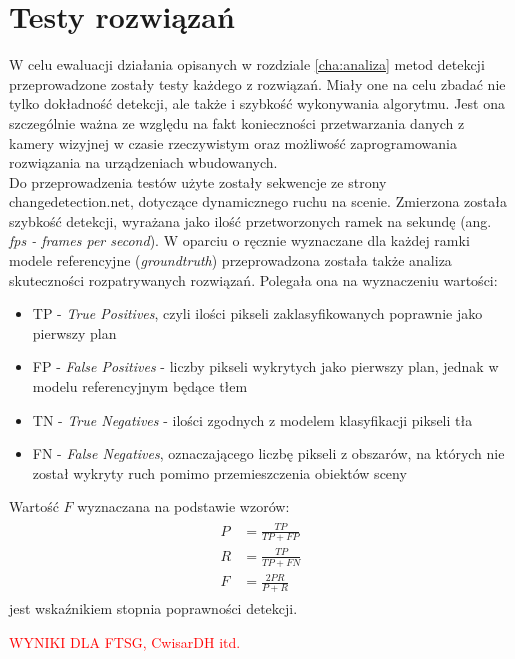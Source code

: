 \chapter{Testy rozwiązań}
\label{cha:testy}

W celu ewaluacji działania opisanych w rozdziale \ref{cha:analiza} metod detekcji przeprowadzone zostały testy każdego z rozwiązań. Miały one na celu zbadać nie tylko dokładność detekcji, ale także i szybkość wykonywania algorytmu. Jest ona szczególnie ważna ze względu na fakt konieczności przetwarzania danych z kamery wizyjnej w czasie rzeczywistym oraz możliwość zaprogramowania rozwiązania na urządzeniach wbudowanych. \\
Do przeprowadzenia testów użyte zostały sekwencje ze strony changedetection.net, dotyczące dynamicznego ruchu na scenie. Zmierzona została szybkość detekcji, wyrażana jako ilość przetworzonych ramek na sekundę (ang. \textit{fps - frames per second}). W oparciu o ręcznie wyznaczane dla każdej ramki modele referencyjne (\textit{groundtruth}) przeprowadzona została także analiza skuteczności rozpatrywanych rozwiązań. Polegała ona na wyznaczeniu wartości:
\begin{itemize}
\item TP - \textit{True Positives}, czyli ilości pikseli zaklasyfikowanych poprawnie jako pierwszy plan
\item FP - \textit{False Positives} - liczby pikseli wykrytych jako pierwszy plan, jednak w modelu referencyjnym będące tłem
\item TN - \textit{True Negatives} - ilości zgodnych z modelem klasyfikacji pikseli tła
\item FN - \textit{False Negatives}, oznaczającego liczbę pikseli z obszarów, na których nie został wykryty ruch pomimo przemieszczenia obiektów sceny
\end{itemize}
Wartość $F$ wyznaczana na podstawie wzorów:
\begin{align}
\begin{split}
P &= \frac{TP}{TP+FP} \\
R &= \frac{TP}{TP+FN} \\
F &= \frac{2PR}{P+R}
\end{split}
\end{align}
jest wskaźnikiem stopnia poprawności detekcji.
\\
\begin{LARGE}
\textcolor{red}{WYNIKI DLA FTSG, CwisarDH itd.}
\end{LARGE}

